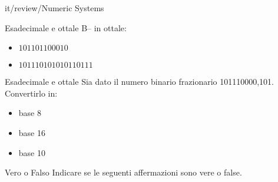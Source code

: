 \documentclass[11pt]{article}
\begin{document}
\begin{quiz}{it/review/Numeric Systems}
\begin{cloze}[points=1,shuffle=false]{Esadecimale e ottale}
B-- in ottale:
\begin{itemize}
\item $101101100010$ 
\item $101110101010110111$ 
\end{itemize}
\end{cloze}

\begin{cloze}[points=1,shuffle=false]{Esadecimale e ottale}
Sia dato il numero binario frazionario 101110000,101. Convertirlo in:

\begin{itemize}
\item base 8 
\item base 16 
\item base 10 
\end{itemize}
\end{cloze}

\begin{cloze}[points=1,shuffle=false]{Vero o Falso}
Indicare se le seguenti affermazioni sono vere o false.


\end{cloze}
\end{quiz}
\end{document}
